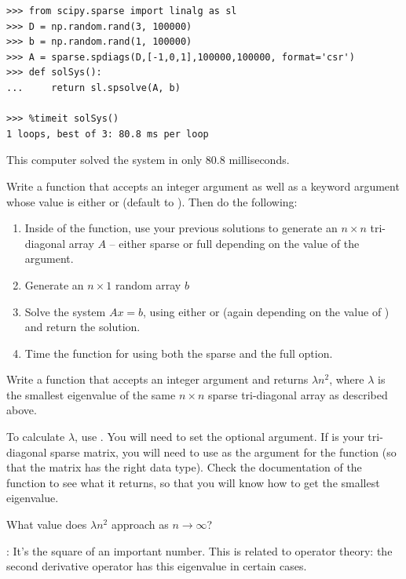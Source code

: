 \begin{lstlisting}
>>> from scipy.sparse import linalg as sl
>>> D = np.random.rand(3, 100000)
>>> b = np.random.rand(1, 100000)
>>> A = sparse.spdiags(D,[-1,0,1],100000,100000, format='csr')
>>> def solSys():
...     return sl.spsolve(A, b)

>>> %timeit solSys()
1 loops, best of 3: 80.8 ms per loop

\end{lstlisting}

This computer solved the system in only 80.8 milliseconds.

\begin{problem}
Write a function that accepts an integer argument  as well as a keyword argument  whose value is either  or  (default to ). Then do the following:
\begin{enumerate}
\item Inside of the function, use your previous solutions to generate an $n \times n$ tri-diagonal array $A$ -- either sparse or full depending on the value of the  argument.
\item Generate an $n \times 1$ random array $b$
\item Solve the system $Ax = b$, using either  or 
(again depending on the value of ) and return the solution.
\item Time the function for  using both the sparse and the full option.
\end{enumerate}
\end{problem}

\begin{problem}
Write a function that accepts an integer argument  and returns $\lambda n^2$, where
$\lambda$ is the smallest eigenvalue of the same $n \times n$ sparse tri-diagonal array as described above.

To calculate $\lambda$, use . You will need to set the 
optional argument. If  is your tri-diagonal sparse matrix, you will need to use
 as the argument for the  function (so that the matrix has the right data type).
Check the documentation of the  function to see what it returns, so that you will know how to
get the smallest eigenvalue.

What value does $\lambda n^2$ approach as $n \rightarrow \infty$?

: It's the square of an important number.
This is related to operator theory: the second derivative operator has this eigenvalue in certain cases.
\end{problem}





 
